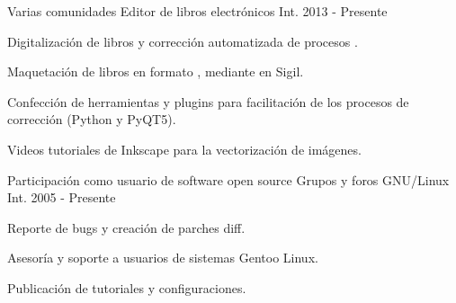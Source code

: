 


\begin{cventries}

  \cventry
    {Varias comunidades} %
    {Editor de libros electrónicos} %
    {Int.} %
    {2013 - Presente} %
    {
      \begin{cvitems} %
        \item {Digitalización de libros y corrección automatizada de procesos .}
        \item {Maquetación de libros en formato ,  mediante  en Sigil.}
        \item {Confección de herramientas y plugins para facilitación de los procesos de corrección (Python y PyQT5).}
        \item {Videos tutoriales de Inkscape para la vectorización de imágenes.}
      \end{cvitems}
    }

  \cventry
    {Participación como usuario de software open source} %
    {Grupos y foros GNU/Linux} %
    {Int.} %
    {2005 - Presente} %
    {
      \begin{cvitems} %
        \item {Reporte de bugs y creación de parches diff.}
        \item {Asesoría y soporte a usuarios de sistemas Gentoo Linux.}
        \item {Publicación de tutoriales y configuraciones.}
      \end{cvitems}
    }


\end{cventries}
